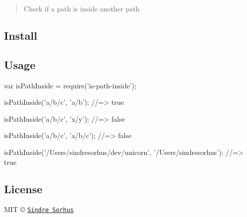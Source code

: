 \begin{quote}
Check if a path is inside another path \end{quote}


\subsection*{Install}




\subsection*{Usage}


\begin{DoxyCode}
var isPathInside = require('is-path-inside');

isPathInside('a/b/c', 'a/b');
//=> true

isPathInside('a/b/c', 'x/y');
//=> false

isPathInside('a/b/c', 'a/b/c');
//=> false

isPathInside('/Users/sindresorhus/dev/unicorn', '/Users/sindresorhus');
//=> true
\end{DoxyCode}


\subsection*{License}

M\+IT © \href{http://sindresorhus.com}{\tt Sindre Sorhus} 